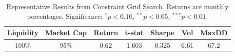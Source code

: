 \begin{table}
\caption{Representative Results from Constraint Grid Search. Returns are monthly percentages. Significance: $^{*}p<0.10$, $^{**}p<0.05$, $^{***}p<0.01$.}
\label{tab:constraints_detailed}
\begin{tabular}{cc|ccccc}
\toprule
Liquidity & Market Cap & Return & t-stat & Sharpe & Vol & MaxDD \\
\midrule
100\% & 95\% & 0.62 & 1.603 & 0.325 & 6.61 & 67.2 \\
\bottomrule
\end{tabular}
\end{table}
